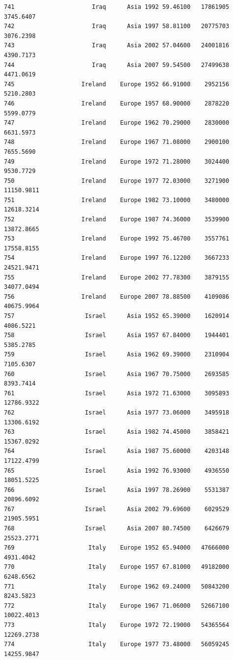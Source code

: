\documentclass[
  letterpaper,
  DIV=11,
  numbers=noendperiod]{scrreprt}
\begin{document}
\begin{verbatim}
741                      Iraq      Asia 1992 59.46100   17861905   3745.6407
742                      Iraq      Asia 1997 58.81100   20775703   3076.2398
743                      Iraq      Asia 2002 57.04600   24001816   4390.7173
744                      Iraq      Asia 2007 59.54500   27499638   4471.0619
745                   Ireland    Europe 1952 66.91000    2952156   5210.2803
746                   Ireland    Europe 1957 68.90000    2878220   5599.0779
747                   Ireland    Europe 1962 70.29000    2830000   6631.5973
748                   Ireland    Europe 1967 71.08000    2900100   7655.5690
749                   Ireland    Europe 1972 71.28000    3024400   9530.7729
750                   Ireland    Europe 1977 72.03000    3271900  11150.9811
751                   Ireland    Europe 1982 73.10000    3480000  12618.3214
752                   Ireland    Europe 1987 74.36000    3539900  13872.8665
753                   Ireland    Europe 1992 75.46700    3557761  17558.8155
754                   Ireland    Europe 1997 76.12200    3667233  24521.9471
755                   Ireland    Europe 2002 77.78300    3879155  34077.0494
756                   Ireland    Europe 2007 78.88500    4109086  40675.9964
757                    Israel      Asia 1952 65.39000    1620914   4086.5221
758                    Israel      Asia 1957 67.84000    1944401   5385.2785
759                    Israel      Asia 1962 69.39000    2310904   7105.6307
760                    Israel      Asia 1967 70.75000    2693585   8393.7414
761                    Israel      Asia 1972 71.63000    3095893  12786.9322
762                    Israel      Asia 1977 73.06000    3495918  13306.6192
763                    Israel      Asia 1982 74.45000    3858421  15367.0292
764                    Israel      Asia 1987 75.60000    4203148  17122.4799
765                    Israel      Asia 1992 76.93000    4936550  18051.5225
766                    Israel      Asia 1997 78.26900    5531387  20896.6092
767                    Israel      Asia 2002 79.69600    6029529  21905.5951
768                    Israel      Asia 2007 80.74500    6426679  25523.2771
769                     Italy    Europe 1952 65.94000   47666000   4931.4042
770                     Italy    Europe 1957 67.81000   49182000   6248.6562
771                     Italy    Europe 1962 69.24000   50843200   8243.5823
772                     Italy    Europe 1967 71.06000   52667100  10022.4013
773                     Italy    Europe 1972 72.19000   54365564  12269.2738
774                     Italy    Europe 1977 73.48000   56059245  14255.9847

\end{verbatim}
\end{document}
